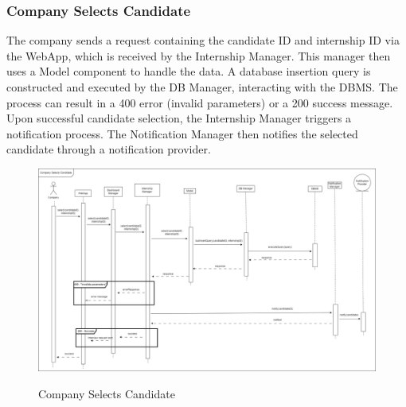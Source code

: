 \documentclass[a4paper,12pt]{article}
\begin{document}
\subsubsection*{Company Selects Candidate}
The company sends a request containing the candidate ID and internship ID via the WebApp, which is received by the Internship Manager. This manager then uses a Model component to handle the data. A database insertion query is constructed and executed by the DB Manager, interacting with the DBMS. The process can result in a 400 error (invalid parameters) or a 200 success message. Upon successful candidate selection, the Internship Manager triggers a notification process. The Notification Manager then notifies the selected candidate through a notification provider.
\begin{figure}[H]
\centering
\includegraphics[scale = 0.30]{DD_figures/RuntimeView/CompanySelectsCandidateRV.drawio.png}\\
\caption{Company Selects Candidate}
\end{figure}

\newpage
\end{document}
